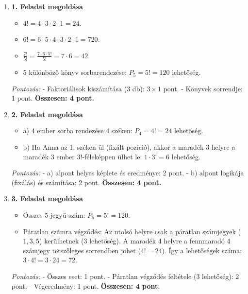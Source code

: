 \documentclass[12pt,a4paper]{article}
\begin{document}
\begin{enumerate}
    \item \textbf{1. Feladat megoldása}
    \begin{itemize}
        \item $4! = 4 \cdot 3 \cdot 2 \cdot 1 = 24$.
        \item $6! = 6 \cdot 5 \cdot 4 \cdot 3 \cdot 2 \cdot 1 = 720$.
        \item $\frac{7!}{5!} = \frac{7 \cdot 6 \cdot 5!}{5!} = 7 \cdot 6 = 42$.
        \item 5 különböző könyv sorbarendezése: $P_5 = 5! = 120$ lehetőség.
    \end{itemize}
    \emph{Pontozás:}
    - Faktoriálisok kiszámítása (3 db): $3 \times 1$ pont.
    - Könyvek sorrendje: 1 pont.
    \textbf{Összesen: 4 pont.}

    \vspace{0.3cm}

    \item \textbf{2. Feladat megoldása}
    \begin{itemize}
        \item a) 4 ember sorba rendezése 4 széken: $P_4 = 4! = 24$ lehetőség.
        \item b) Ha Anna az 1. széken ül (fixált pozíció), akkor a maradék 3 helyre a maradék 3 ember $3!$-féleképpen ülhet le: $1 \cdot 3! = 6$ lehetőség.
    \end{itemize}
    \emph{Pontozás:}
    - a) alpont helyes képlete és eredménye: 2 pont.
    - b) alpont logikája (fixálás) és számítása: 2 pont.
    \textbf{Összesen: 4 pont.}

    \vspace{0.3cm}

    \item \textbf{3. Feladat megoldása}
    \begin{itemize}
        \item Összes 5-jegyű szám: $P_5 = 5! = 120$.
        \item Páratlan számra végződés: Az utolsó helyre csak a páratlan számjegyek ($1, 3, 5$) kerülhetnek (3 lehetőség). A maradék 4 helyre a fennmaradó 4 számjegy tetszőleges sorrendben jöhet ($4! = 24$). Így a lehetőségek száma: $3 \cdot 4! = 3 \cdot 24 = 72$.
    \end{itemize}
    \emph{Pontozás:}
    - Összes eset: 1 pont.
    - Páratlan végződés feltétele (3 lehetőség): 2 pont.
    - Végeredmény: 1 pont.
    \textbf{Összesen: 4 pont.}

    \vspace{0.3cm}


\end{enumerate}
\end{document}
